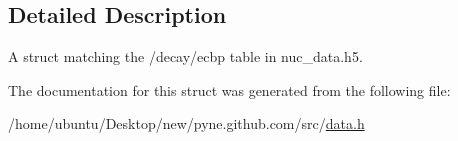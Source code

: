 \subsection{Detailed Description}
A struct matching the \textquotesingle{}/decay/ecbp\textquotesingle{} table in nuc\+\_\+data.\+h5. 

The documentation for this struct was generated from the following file\+:\begin{DoxyCompactItemize}
\item 
/home/ubuntu/\+Desktop/new/pyne.\+github.\+com/src/\hyperlink{data_8h}{data.\+h}\end{DoxyCompactItemize}
